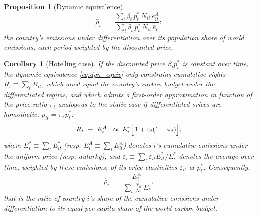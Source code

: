 \documentclass[12pt,english]{article}
\newtheorem{proposition}{Proposition}
\newtheorem{corollary}{Corollary}
\theoremstyle{remark}
\begin{document}
\begin{proposition}[Dynamic equivalence]
\begin{equation}
  \hat\rho_i \;=\; \frac{\sum_t \beta_t\,p^*_t\,N_{it}\,e^A_{it}}{\sum_t \beta_t\,p^*_t\,N_{it}\,\bar e_t}:%
  \label{eq:rhohat_dyn}
\end{equation}
the country's emissions under differentiation over its population share of world emissions, each period weighted by the discounted price. 
\end{proposition}

\begin{corollary}[Hotelling case]\label{cor:hotelling}
If the discounted price $\beta_t p^*_t$ is constant over time, the dynamic equivalence \eqref{eq:dyn_equiv} only constrains cumulative rights $R_i\equiv\sum_t R_{it}$, which must equal the country's carbon budget under the differentiated regime, and which admits a first-order approximation in function of the price ratio $\pi_i$ analogous to the static case if differentiated prices are homothetic, $p_{it}=\pi_i\,p^*_t$:
\begin{equation}
  R_i \;=\; E^A_i \;\;\approx\; E^*_i\Bigl[\,1+\varepsilon_i(1-\pi_i)\Bigr],
  \label{eq:hotelling_budget}
\end{equation} %
where $E^*_i\equiv\sum_t E^*_{it}$ (resp. $E^A_i\equiv\sum_t E^A_{it}$) denotes $i$'s cumulative emissions under the uniform price (resp. autarky), and $\varepsilon_i\equiv\sum_t \varepsilon_{it}E^*_{it}/E^*_i$ denotes the average over time, weighted by these emissions, of its price elasticities $\varepsilon_{it}$ at $p^*_t$. Consequently,
\begin{equation}
  \hat\rho_i \;=\; \frac{E^A_i}{\sum_t \frac{N_{it}}{N_t}\,E_t},
  \label{eq:rhohat_hotelling}
\end{equation}
that is the ratio of country $i$'s share of the cumulative emissions under differentiation to its equal per capita share of the world carbon budget. %
\end{corollary}
\end{document}
